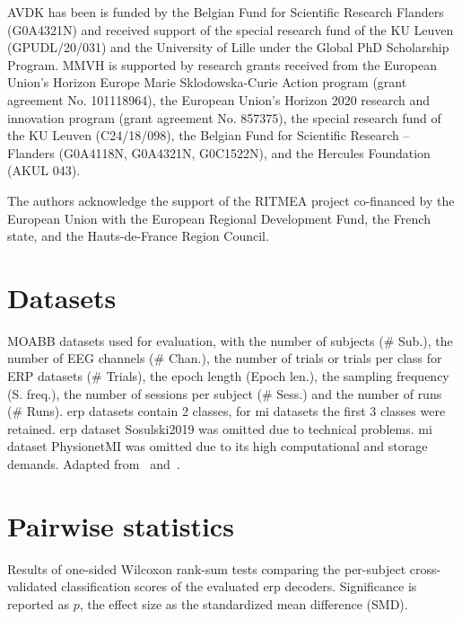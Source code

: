\documentclass[twocolumn]{article}
\begin{document}
AVDK has been is funded by the Belgian Fund for Scientific Research Flanders
(G0A4321N) and received support of the special research fund of the KU Leuven
(GPUDL/20/031) and the University of Lille under the Global PhD Scholarship Program.
MMVH is supported by research grants received from the European Union’s
Horizon Europe Marie Sklodowska-Curie Action program
(grant agreement No. 101118964), the European Union’s Horizon 2020 research and
innovation program (grant agreement No. 857375), the special research fund of
the KU Leuven (C24/18/098), the Belgian Fund for Scientific Research – Flanders
(G0A4118N, G0A4321N, G0C1522N), and the Hercules Foundation (AKUL 043).

The authors acknowledge the support of the RITMEA project co-financed by the
European Union with the European Regional Development Fund, the French state,
and the Hauts-de-France Region Council.


\printbibliography%
\clearpage%

\appendix
\setcounter{table}{0}
\renewcommand{\thetable}{\thesection\arabic{table}}



\onecolumn

\section{Datasets}

\begin{table*}[!htbp]
	\footnotesize
	
	\caption{MOABB datasets used for evaluation, with the number of
		subjects (\# Sub.), the number of EEG channels (\# Chan.), the number of trials or trials per class for ERP
		datasets (\# Trials), the epoch length (Epoch len.), the sampling
		frequency (S. freq.), the number of sessions per subject (\# Sess.) and the
		number of runs (\# Runs). \ac{erp} datasets contain 2 classes, for \ac{mi} datasets the first 3 classes were retained. \Ac{erp} dataset Sosulski2019 was omitted due to technical problems.
		\Ac{mi} dataset PhysionetMI was omitted due to its high computational and
		storage demands.
		Adapted from~\cite{Aristimunha2023}
		and~\cite{Chevallier2024}.}%
	\label{tab:moabb}
\end{table*}

\newpage

\section{Pairwise statistics}
\begin{table*}[!htbp]
	\footnotesize
	
	\caption{Results of one-sided Wilcoxon rank-sum tests comparing the
		per-subject cross-validated classification scores of the evaluated \ac{erp}
		decoders.
		Significance is reported as $p$, the effect size as the standardized mean
		difference (SMD).}
	\label{tab:results/erp/stats}
\end{table*}
\end{document}
